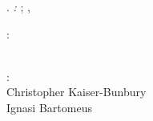 
\thispagestyle{empty}

\hfill

\vfill

\noindent\myName. \textit{\myTitle:} \mySubtitle; \myDegree, \myTime

\bigskip
%
\noindent{}: \\
\myProf \\
\myOtherProf %
%
\medskip

\noindent{}: \\
Christopher Kaiser-Bunbury \\
Ignasi Bartomeus %
%
\medskip

\myLocation


